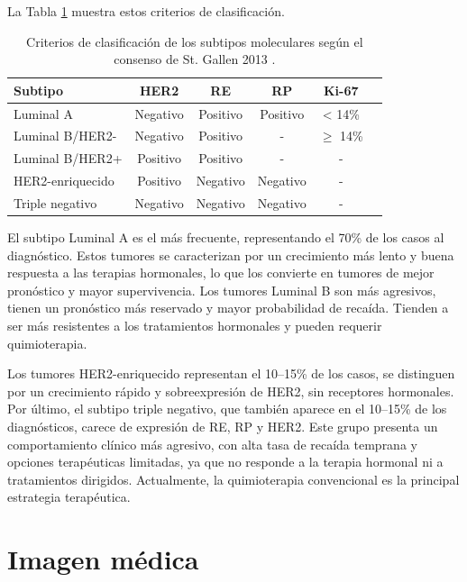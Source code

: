 \documentclass[a4paper,10pt]{book}
\begin{document}
La Tabla \ref{tab:molecular_subtypes_comb} muestra estos criterios de clasificación.

\begin{table}[h!]
	\centering
        \caption[Criterios de clasificación de subtipos moleculares de cáncer de mama]{Criterios de clasificación de los subtipos moleculares según el consenso de St. Gallen 2013 \cite{goldhirsch_personalizing_2013}.}
	\begin{tabular}{lccccc}
		\toprule
		\textbf{Subtipo} & \textbf{HER2} & \textbf{RE} & \textbf{RP} & \textbf{Ki-67} \\
		\midrule
		Luminal A        & Negativo      & Positivo    & Positivo    & < 14\%         \\
		Luminal B/HER2-  & Negativo      & Positivo    & -           & $\geq$ 14\%    \\
		Luminal B/HER2+  & Positivo      & Positivo    & -           & -              \\
		HER2-enriquecido & Positivo      & Negativo    & Negativo    & -              \\
		Triple negativo  & Negativo      & Negativo    & Negativo    & -              \\
		\bottomrule
	\end{tabular}
	\label{tab:molecular_subtypes_comb}
\end{table}

El subtipo Luminal A es el más frecuente, representando el 70\% de los casos al diagnóstico. Estos tumores se caracterizan por un crecimiento más lento y buena respuesta a las terapias hormonales, lo que los convierte en tumores de mejor pronóstico y mayor supervivencia. Los tumores Luminal B son más agresivos, tienen un pronóstico más reservado y mayor probabilidad de recaída. Tienden a ser más resistentes a los tratamientos hormonales y pueden requerir quimioterapia.

Los tumores HER2-enriquecido representan el 10–15\% de los casos, se distinguen por un crecimiento rápido y sobreexpresión de HER2, sin receptores hormonales. Por último, el subtipo triple negativo, que también aparece en el 10–15\% de los diagnósticos, carece de expresión de RE, RP y HER2. Este grupo presenta un comportamiento clínico más agresivo, con alta tasa de recaída temprana y opciones terapéuticas limitadas, ya que no responde a la terapia hormonal ni a tratamientos dirigidos. Actualmente, la quimioterapia convencional es la principal estrategia terapéutica.

\section{Imagen médica}
\end{document}
